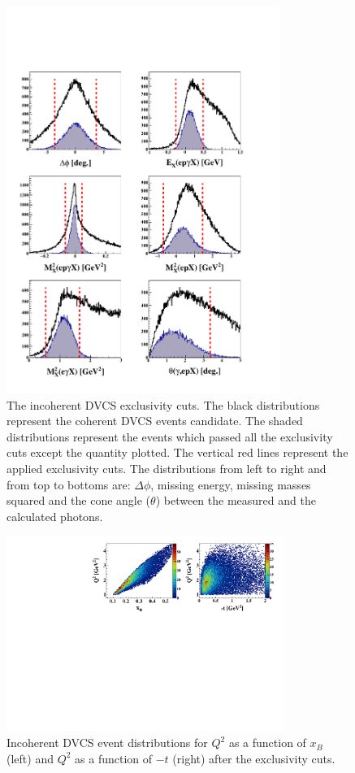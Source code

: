 \documentclass[twocolumn,nofootinbib,showpacs,prl,superscriptaddress,secnumarabic,amssymb,nobibnotes,aps,floatfix]{revtex4}
\begin{document}
\begin{figure}[tb]
\includegraphics[width=8.9cm]{figs/incoh_exc_cuts_final.pdf}
\caption{The incoherent DVCS exclusivity cuts. The black distributions 
   represent the coherent DVCS events candidate. The shaded distributions 
   represent the events which passed all the exclusivity cuts except the 
   quantity plotted. The vertical red lines represent the applied exclusivity 
cuts. The distributions from left to right and from top to bottoms are: $\Delta 
\phi$, missing energy, missing masses squared and the cone angle ($\theta$) 
between the measured and the calculated photons.}
\label{fig:kin-cuts}
\end{figure}
 

\begin{figure}[tb]
\hspace{-0.45cm}
\includegraphics[width=9.0cm]{figs/Q2_xB_t_InCoh.pdf}
\caption{Incoherent DVCS event distributions for $Q^{2}$ as a function of 
$x_{B}$ (left) and $Q^{2}$ as a function of $-t$ (right) after the exclusivity 
cuts.}
\label{fig:kin-coverage}
\end{figure}
\end{document}
